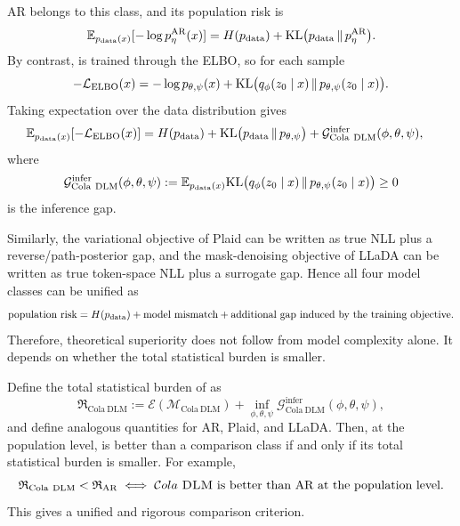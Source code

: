 AR belongs to this class, and its population risk is
\begin{equation}
\mathbb{E}_{p_{\mathrm{data}}(x)}[-\log p^{\mathrm{AR}}_{\eta}(x)]
=
H(p_{\mathrm{data}})+\mathrm{KL}\bigl(p_{\mathrm{data}}\,\|\,p^{\mathrm{AR}}_{\eta}\bigr).
\label{eq:app_ar_population_risk}
\end{equation}
By contrast, \method is trained through the ELBO, so for each sample
\begin{equation}
-\mathcal{L}_{\mathrm{ELBO}}(x)
=
-\log p_{\theta,\psi}(x)
+
\mathrm{KL}\bigl(q_{\phi}(z_0\mid x)\,\|\,p_{\theta,\psi}(z_0\mid x)\bigr).
\label{eq:app_ldlm_elbo_gap_per_sample}
\end{equation}
Taking expectation over the data distribution gives
\begin{align}
\mathbb{E}_{p_{\mathrm{data}}(x)}[-\mathcal{L}_{\mathrm{ELBO}}(x)]
&=
H(p_{\mathrm{data}})
+\mathrm{KL}\bigl(p_{\mathrm{data}}\,\|\,p_{\theta,\psi}\bigr)
+\mathcal G^{\mathrm{infer}}_{\mathrm{Cola\ DLM}}(\phi,\theta,\psi),
\label{eq:app_ldlm_population_risk}
\end{align}
where
\begin{equation}
\mathcal G^{\mathrm{infer}}_{\mathrm{Cola\ DLM}}(\phi,\theta,\psi)
:=
\mathbb{E}_{p_{\mathrm{data}}(x)}\mathrm{KL}\bigl(q_{\phi}(z_0\mid x)\,\|\,p_{\theta,\psi}(z_0\mid x)\bigr)
\ge 0
\label{eq:app_ldlm_inference_gap}
\end{equation}
is the inference gap.

Similarly, the variational objective of Plaid can be written as true NLL plus a reverse/path-posterior gap, and the mask-denoising objective of LLaDA can be written as true token-space NLL plus a surrogate gap. Hence all four model classes can be unified as
\begin{equation}
\text{population risk}
=
H(p_{\mathrm{data}})+\text{model mismatch}+\text{additional gap induced by the training objective}.
\label{eq:app_unified_population_risk}
\end{equation}
Therefore, theoretical superiority does not follow from model complexity alone. It depends on whether the total statistical burden is smaller.

Define the total statistical burden of \method as
\begin{equation}
\mathfrak R_{\mathrm{Cola\ DLM}}
:=
\mathcal E(\mathcal M_{\mathrm{Cola\ DLM}})
+
\inf_{\phi,\theta,\psi}\mathcal G^{\mathrm{infer}}_{\mathrm{Cola\ DLM}}(\phi,\theta,\psi),
\label{eq:app_ldlm_total_burden}
\end{equation}
and define analogous quantities for AR, Plaid, and LLaDA. Then, at the population level, \method is better than a comparison class if and only if its total statistical burden is smaller. For example,
\begin{equation}
\mathfrak R_{\mathrm{Cola\ DLM}}<\mathfrak R_{\mathrm{AR}}
\iff
\text{\method is better than AR at the population level}.
\label{eq:app_ldlm_better_than_ar}
\end{equation}
This gives a unified and rigorous comparison criterion.

